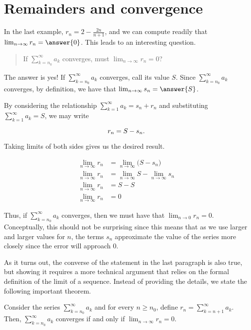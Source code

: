 \documentclass{ximera}
\begin{document}
\section{Remainders and convergence}

In the last example, $r_n = 2-\frac{2n}{n+1}$, and we can compute readily that $\lim_{n \to \infty} r_n = \answer{0}$.  This leads to an interesting question.

\begin{quote}
If $\sum_{k=n_0}^\infty a_k$ converges, must $\lim_{n \to \infty} r_n =0$?
\end{quote}

The answer is yes!  If $\sum_{k=n_0}^\infty a_k$ converges, call its value $S$.  Since $\sum_{k=n_0}^\infty a_k$ converges, by definition, we have that $\lim_{n \to \infty} s_n = \answer{S}$.  

By considering the relationship $ \sum_{k=1}^{\infty} a_k = s_n+r_n$ and substituting $ \sum_{k=1}^{\infty} a_k =S$, we may write 

\[ r_n = S - s_n. \\
\]

Taking limits of both sides gives us the desired result.

\begin{align*}
\lim_{n \to \infty} r_n &= \lim_{n \to \infty} \bigg(S- s_n\bigg) \\
\lim_{n \to \infty} r_n &= \lim_{n \to \infty} S- \lim_{n \to \infty} s_n \\
\lim_{n \to \infty} r_n &= S- S  \\
 \lim_{n \to \infty} r_n  &= 0
\end{align*}

Thus, if $\sum_{k=n_0}^{\infty} a_k$ converges, then we must have that $\lim_{n \to 0} r_n =0$.  Conceptually, this should not be surprising since this means that as we use larger and larger values for $n$, the terms $s_n$ approximate the value of the series more closely since the error will approach $0$. 

As it turns out, the converse of the statement in the last paragraph is also true, but showing it requires a more technical argument that relies on the formal definition of the limit of a sequence.  Instead of providing the details, we state the following important theorem.  

\begin{theorem}
Consider the series $\sum_{k=n_0}^{\infty} a_k$ and for every $n \geq n_0$, define $r_n = \sum_{k=n+1}^{\infty} a_k$.  Then, $\sum_{k=n_0}^{\infty} a_k$ converges if and only if $\lim_{n \to \infty} r_n =0$.
\end{theorem}
\end{document}
